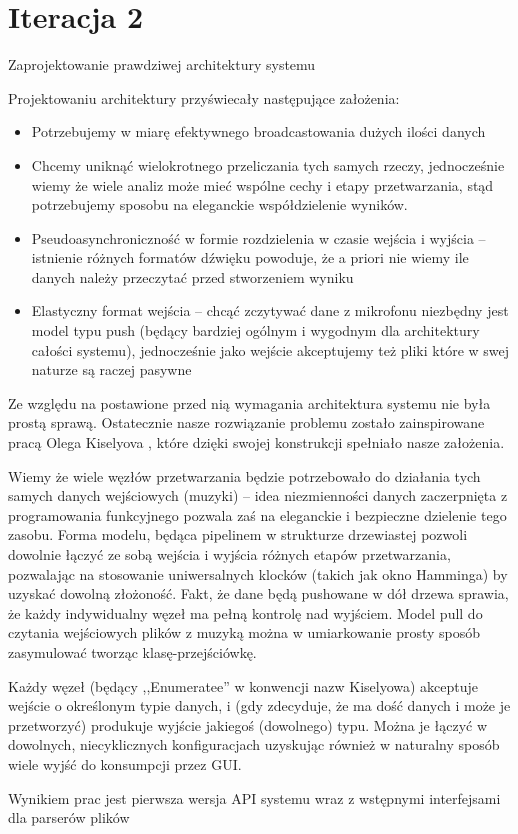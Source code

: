 \section{Iteracja 2}
\begin{Note}


Zaprojektowanie prawdziwej architektury systemu


Projektowaniu architektury przyświecały następujące założenia:
\begin{itemize}

    \item Potrzebujemy w miarę efektywnego broadcastowania dużych ilości danych
    \item Chcemy uniknąć wielokrotnego przeliczania tych samych rzeczy, jednocześnie wiemy że wiele analiz może mieć wspólne cechy i etapy przetwarzania, stąd potrzebujemy sposobu na eleganckie współdzielenie wyników.
    \item Pseudoasynchroniczność w formie rozdzielenia w czasie wejścia i wyjścia -- istnienie różnych formatów dźwięku powoduje, że a priori nie wiemy ile danych należy przeczytać przed stworzeniem wyniku
    \item Elastyczny format wejścia -- chcąć zczytywać dane z mikrofonu niezbędny jest model typu push (będący bardziej ogólnym i wygodnym dla architektury całości systemu), jednocześnie jako wejście akceptujemy też pliki które w swej naturze są raczej pasywne

\end{itemize}

Ze względu na postawione przed nią wymagania architektura systemu nie była prostą sprawą.
Ostatecznie nasze rozwiązanie problemu zostało zainspirowane pracą Olega Kiselyova \cite{kiselyov}, które dzięki swojej konstrukcji spełniało nasze założenia.

Wiemy że wiele węzłów przetwarzania będzie potrzebowało do działania tych samych danych wejściowych
(muzyki) -- idea niezmienności danych zaczerpnięta z programowania funkcyjnego pozwala zaś na eleganckie i bezpieczne dzielenie tego zasobu. Forma modelu, będąca pipelinem w strukturze drzewiastej pozwoli dowolnie łączyć ze sobą wejścia i wyjścia różnych etapów przetwarzania, pozwalając na stosowanie uniwersalnych klocków (takich jak okno Hamminga) by uzyskać dowolną złożoność. Fakt, że dane będą pushowane w dół drzewa sprawia, że każdy indywidualny węzeł ma pełną kontrolę nad wyjściem. Model pull do czytania wejściowych plików z muzyką można w umiarkowanie prosty sposób zasymulować tworząc klasę-przejściówkę.

Każdy węzeł (będący ,,Enumeratee'' w konwencji nazw Kiselyowa) akceptuje wejście o określonym typie danych, i (gdy zdecyduje, że ma dość danych i może je przetworzyć) produkuje wyjście jakiegoś (dowolnego) typu. Można je łączyć w dowolnych, niecyklicznych konfiguracjach uzyskując również w naturalny sposób wiele wyjść do konsumpcji przez GUI.

Wynikiem prac jest pierwsza wersja API systemu wraz z wstępnymi interfejsami dla parserów plików

\end{Note}

